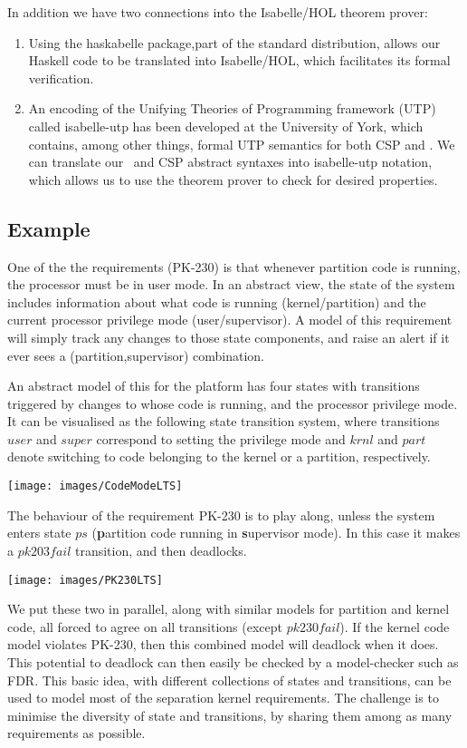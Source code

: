 In addition we have two connections into
the Isabelle/HOL theorem prover:
\begin{enumerate}
  \item
    Using the \textsf{haskabelle} package,part of the standard distribution,
    allows our Haskell code to be translated into Isabelle/HOL,
    which facilitates its formal verification.
  \item
    An encoding of
    the Unifying Theories of Programming framework (UTP)
    called \textsf{isabelle-utp} has been developed
    at the University of York\cite{FosterZW14},
    which contains, among other things, formal UTP semantics for both CSP and
    \Circus.
    We can translate our \Circus\ and CSP abstract syntaxes into
    \textsf{isabelle-utp} notation,
    which allows us to use the theorem prover to check for desired properties.
\end{enumerate}

\subsection{Example}

One of the the requirements (PK-230) is that whenever partition code is running,
the processor must be in user mode.
In an abstract view,
the state of the system includes information about
what code is running (kernel/partition)
and the current processor privilege mode (user/supervisor).
A model of this requirement will simply track any changes
to those state components,
and raise an alert if it ever sees a (partition,supervisor) combination.

An abstract model of this for the platform
has four states with transitions triggered
by changes to whose code is running, and the processor privilege mode.
It can be visualised as the following state transition system,
where transitions $user$ and $super$ correspond to setting the privilege mode
and $krnl$ and $part$ denote switching to code belonging to the kernel or
a partition, respectively.

\texttt{[image: images/CodeModeLTS]}

The behaviour of the requirement PK-230 is to play along,
unless the system enters state $ps$
(\textbf{p}artition code running in \textbf{s}upervisor mode).
In this case it makes a $pk203fail$ transition, and then deadlocks.

\texttt{[image: images/PK230LTS]}

We put these two in parallel, along with similar models for partition
and kernel code, all forced to agree on all transitions (except $pk230fail$).
If the kernel code model violates PK-230, then this combined model
will deadlock when it does.
This potential to deadlock can then easily be checked by a model-checker
such as FDR.
This basic idea, with different collections of states and transitions,
can be used to model most of the separation kernel requirements.
The challenge is to minimise the diversity of state and transitions,
by sharing them among as many requirements as possible.

